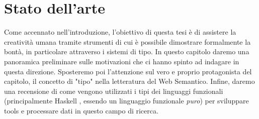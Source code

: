 \chapter[Stato dell'arte]{Stato dell'arte}
Come accennato nell'introduzione, l'obiettivo di questa tesi è di assistere la creatività umana tramite strumenti di cui è possibile dimostrare formalmente la bontà, in particolare attraverso i sistemi di tipo. In questo capitolo daremo una panoramica preliminare sulle motivazioni che ci hanno spinto ad indagare in questa direzione. Sposteremo poi l'attenzione sul vero e proprio protagonista del capitolo, il concetto di "tipo" nella letteratura del Web Semantico. Infine, daremo una recensione di come vengono utilizzati i tipi dei linguaggi funzionali (principalmente Haskell \cite{o2008real}, essendo un linguaggio funzionale \textit{puro}) per sviluppare tools e processare dati in questo campo di ricerca.
\\
